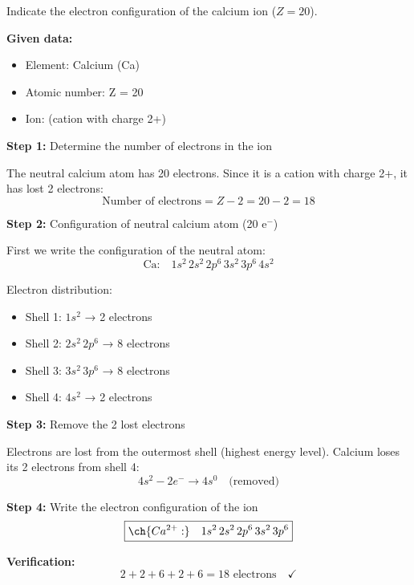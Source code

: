 \begin{exercise}
    Indicate the electron configuration of the calcium ion  (\( Z = 20 \)).
    \begin{solu}
        \textbf{Given data:}
        \begin{itemize}
            \item Element: Calcium (Ca)
            \item Atomic number: Z = 20
            \item Ion:  (cation with charge 2+)
        \end{itemize}

        \textbf{Step 1:} Determine the number of electrons in the ion

        The neutral calcium atom has 20 electrons. Since it is a cation with charge 2+, it has lost 2 electrons:
        \[
            \text{Number of electrons} = Z - 2 = 20 - 2 = 18
        \]

        \textbf{Step 2:} Configuration of neutral calcium atom (20 e\(^-\))

        First we write the configuration of the neutral atom:
        \[
            \text{Ca:} \quad 1s^2 \, 2s^2 \, 2p^6 \, 3s^2 \, 3p^6 \, 4s^2
        \]

        Electron distribution:
        \begin{itemize}
            \item Shell 1: \(1s^2\) → 2 electrons
            \item Shell 2: \(2s^2 \, 2p^6\) → 8 electrons
            \item Shell 3: \(3s^2 \, 3p^6\) → 8 electrons
            \item Shell 4: \(4s^2\) → 2 electrons
        \end{itemize}

        \textbf{Step 3:} Remove the 2 lost electrons

        Electrons are lost from the outermost shell (highest energy level). Calcium loses its 2 electrons from shell 4:
        \[
            4s^2 - 2e^- \rightarrow 4s^0 \quad \text{(removed)}
        \]

        \textbf{Step 4:} Write the electron configuration of the ion
        \[
            \boxed{\ch{Ca^{2+}:} \quad 1s^2 \, 2s^2 \, 2p^6 \, 3s^2 \, 3p^6}
        \]

        \textbf{Verification:}
        \[
            2 + 2 + 6 + 2 + 6 = 18 \text{ electrons} \quad \checkmark
        \]


\end{solu}
\end{exercise}
